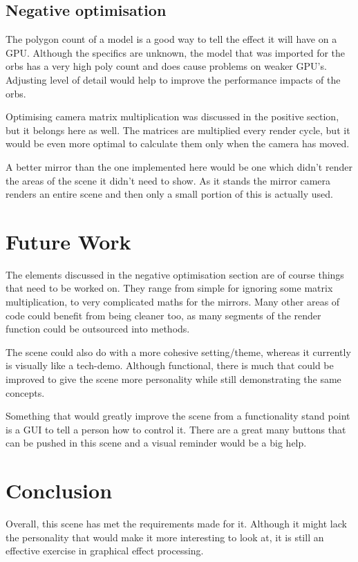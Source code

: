 \documentclass[10pt, a4paper]{article}
\begin{document}
	\subsection{Negative optimisation}
	The polygon count of a model is a good way to tell the effect it will have on a GPU.  Although the specifics are unknown, the model that was imported for the orbs has a very high poly count and does cause problems on weaker GPU's.  Adjusting level of detail would help to improve the performance impacts of the orbs.
	
	Optimising camera matrix multiplication was discussed in the positive section, but it belongs here as well.  The matrices are multiplied every render cycle, but it would be even more optimal to calculate them only when the camera has moved.
	
	A better mirror than the one implemented here would be one which didn't render the areas of the scene it didn't need to show.  As it stands the mirror camera renders an entire scene and then only a small portion of this is actually used.
	
	\section{Future Work}
	
	The elements discussed in the negative optimisation section are of course things that need to be worked on.  They range from simple for ignoring some matrix multiplication, to very complicated maths for the mirrors.  Many other areas of code could benefit from being cleaner too, as many segments of the render function could be outsourced into methods.
	
	The scene could also do with a more cohesive setting/theme, whereas it currently is visually like a tech-demo.  Although functional, there is much that could be improved to give the scene more personality while still demonstrating the same concepts.
	
	Something that would greatly improve the scene from a functionality stand point is a GUI to tell a person how to control it.  There are a great many buttons that can be pushed in this scene and a visual reminder would be a big help.
	
	\section{Conclusion}	
	Overall, this scene has met the requirements made for it.  Although it might lack the personality that would make it more interesting to look at, it is still an effective exercise in graphical effect processing.  
	
%	
%	
		
\end{document}
